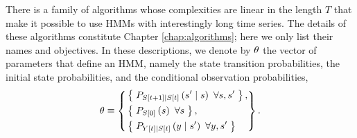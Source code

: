 There is a family of algorithms whose complexities are linear in the
length $T$ that make it possible to use HMMs with interestingly long
time series.  The details of these algorithms constitute Chapter
\ref{chap:algorithms}; here we only list their names and objectives.
In these descriptions, we denote by $\theta$ the vector of
parameters that define an HMM, namely the state transition
probabilities, the initial state probabilities, and the conditional
observation probabilities,
\begin{equation*}
   \theta \equiv \left\{
     \begin{aligned}
       &\left\{\; P_{{S}{[t+1]}\mid {S}{[t]}} \left(s'\mid s
       \right)~\forall s,s' \;\right\},\\
       & \left\{\; P_{{S}{[0]}} \left(s \right)~\forall s
       \;\right\},\\
       &  \left\{\; P_{{Y}{[t]}\mid {S}{[t]}} \left(y\mid s' \right)
       ~ \forall y,s' \;\right\}
     \end{aligned}
   \right\}.
\end{equation*}
